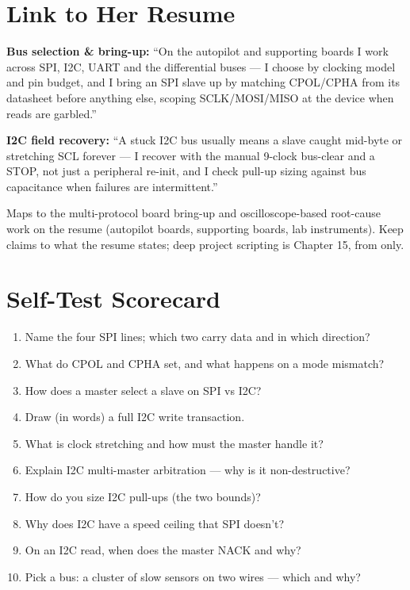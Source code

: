\section{Link to Her Resume}

\begin{resumelink}
\textbf{Bus selection \& bring-up:} ``On the autopilot and supporting boards I
work across SPI, I2C, UART and the differential buses --- I choose by clocking
model and pin budget, and I bring an SPI slave up by matching CPOL/CPHA from its
datasheet before anything else, scoping SCLK/MOSI/MISO at the device when reads
are garbled.''

\medskip
\textbf{I2C field recovery:} ``A stuck I2C bus usually means a slave caught
mid-byte or stretching SCL forever --- I recover with the manual 9-clock
bus-clear and a STOP, not just a peripheral re-init, and I check pull-up sizing
against bus capacitance when failures are intermittent.''

\medskip
\small Maps to the multi-protocol board bring-up and oscilloscope-based
root-cause work on the resume (autopilot boards, supporting boards, lab
instruments). Keep claims to what the resume states; deep project scripting is
Chapter 15, from  only.
\end{resumelink}

\section{Self-Test Scorecard}

\begin{scorecard}
\begin{enumerate}
\item Name the four SPI lines; which two carry data and in which direction?
\item What do CPOL and CPHA set, and what happens on a mode mismatch?
\item How does a master select a slave on SPI vs I2C?
\item Draw (in words) a full I2C write transaction.
\item What is clock stretching and how must the master handle it?
\item Explain I2C multi-master arbitration --- why is it non-destructive?
\item How do you size I2C pull-ups (the two bounds)?
\item Why does I2C have a speed ceiling that SPI doesn't?
\item On an I2C read, when does the master NACK and why?
\item Pick a bus: a cluster of slow sensors on two wires --- which and why?
\end{enumerate}
\end{scorecard}

